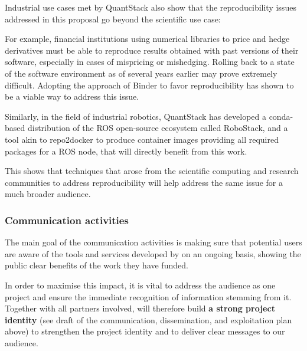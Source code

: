 Industrial use cases met by QuantStack also show that the reproducibility issues addressed in this proposal go
beyond the scientific use case:

\begin{compactitem}
\item For example, financial institutions using numerical libraries to price and hedge derivatives must be able
   to reproduce results obtained with past versions of their software, especially in cases of mispricing or
   mishedging. Rolling back to a state of the software environment as of several years earlier may prove
   extremely difficult. Adopting the approach of Binder to favor reproducibility has shown to be a viable way
   to address this issue.
\item Similarly, in the field of industrial robotics, QuantStack has developed a conda-based distribution of the
   ROS open-source ecosystem called RoboStack, and a tool akin to repo2docker to produce container images providing
   all required packages for a ROS node, that will directly benefit from this work.
\end {compactitem}

This shows that techniques that arose from the scientific computing and research communities to address reproducibility
will help address the same issue for a much broader audience.

\subsubsection{Communication activities}

The main goal of the communication activities is making sure that potential users
are aware of the tools and services developed by \TheProject
on an ongoing basis,
showing the public clear benefits of the work they have funded.

In order to maximise this impact, it is vital to address the audience as one project
and ensure the immediate recognition of information stemming from it.
Together with all partners involved, \TheProject will therefore build \textbf{a strong project identity}
(see draft of the communication, dissemination, and exploitation plan above) to strengthen the project
identity and to deliver clear messages to our audience.


